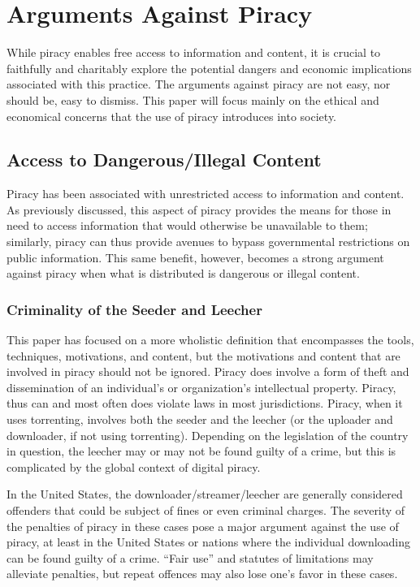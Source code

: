 \documentclass[onecolumn, 12pt]{article}
\begin{document}
\section{Arguments Against Piracy}
While piracy enables free access to information and content, it is crucial to
faithfully and charitably explore the potential dangers and economic
implications associated with this practice. The arguments against piracy are
not easy, nor should be, easy to dismiss. This paper will focus mainly on the
ethical and economical concerns that the use of piracy introduces into society.

\subsection{Access to Dangerous/Illegal Content}
Piracy has been associated with unrestricted access to information and
content. As previously discussed, this aspect of piracy provides the means for
those in need to access information that would otherwise be unavailable to them;
similarly, piracy can thus provide avenues to bypass governmental restrictions
on public information. This same benefit, however, becomes a strong argument
against piracy when what is distributed is dangerous or illegal content.

\subsubsection{Criminality of the Seeder and Leecher}
This paper has focused on a more wholistic definition that encompasses
the tools, techniques, motivations, and content, but the motivations and
content that are involved in piracy should not be ignored. Piracy does involve
a form of theft and dissemination of an individual's or organization's
intellectual property. Piracy, thus can and most often does violate laws in
most jurisdictions. Piracy, when it uses torrenting, involves both the
seeder and the leecher (or the uploader and downloader, if not using torrenting).
Depending on the legislation of the country in question, the leecher may or
may not be found guilty of a crime, but this is complicated by the global
context of digital piracy.

In the United States, the downloader/streamer/leecher are generally considered
offenders that could be subject of fines or even criminal charges. The severity
of the penalties of piracy in these cases pose a major argument against the use
of piracy, at least in the United States or nations where the individual
downloading can be found guilty of a crime. ``Fair use'' and statutes of
limitations may alleviate penalties, but repeat offences may also lose one's
favor in these cases.~\cite{felonies.org}
\end{document}
